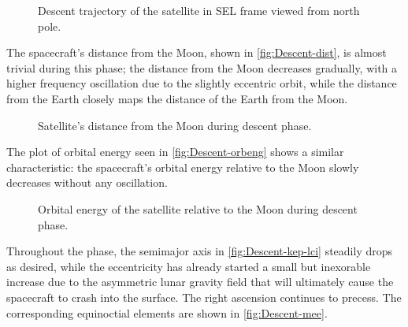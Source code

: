 \begin{figure}
\centering
\def\svgwidth{\figurewidth}

\caption{Descent trajectory of the satellite in SEL frame viewed from north pole.} \label{fig:Descent-3D-sel}
\end{figure}


The spacecraft's distance from the Moon, shown in \autoref{fig:Descent-dist}, is almost trivial during this phase; the distance from the Moon decreases gradually, with a higher frequency oscillation due to the slightly eccentric orbit, while the distance from the Earth closely maps the distance of the Earth from the Moon.

\begin{figure}
\centering
\def\svgwidth{\figurewidth}

\caption{Satellite's distance from the Moon during descent phase.} \label{fig:Descent-dist}
\end{figure}


The plot of orbital energy seen in \autoref{fig:Descent-orbeng} shows a similar characteristic: the spacecraft's orbital energy relative to the Moon slowly decreases without any oscillation.

\begin{figure}
\centering
\def\svgwidth{\figurewidth}

\caption{Orbital energy of the satellite relative to the Moon during descent phase.} \label{fig:Descent-orbeng}
\end{figure}

Throughout the phase, the semimajor axis in \autoref{fig:Descent-kep-lci} steadily drops as desired, while the eccentricity has already started a small but inexorable increase due to the asymmetric lunar gravity field that will ultimately cause the spacecraft to crash into the surface. The right ascension continues to precess. The corresponding equinoctial elements are shown in \autoref{fig:Descent-mee}.

